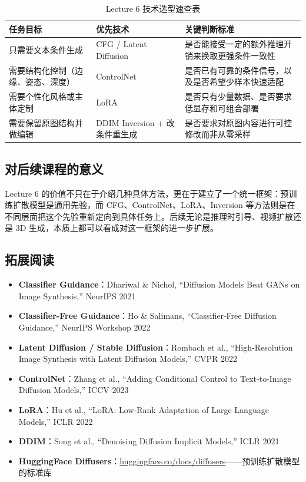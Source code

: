 \begin{table}[H]
\centering
\begin{tabular}{p{} p{} p{}}
\toprule
任务目标 & 优先技术 & 关键判断标准 \\
\midrule
只需要文本条件生成 & CFG / Latent Diffusion & 是否能接受一定的额外推理开销来换取更强条件一致性 \\
需要结构化控制（边缘、姿态、深度） & ControlNet & 是否已有可靠的条件信号，以及是否希望少样本快速适配 \\
需要个性化风格或主体定制 & LoRA & 是否只有少量数据、是否要求低显存和可组合部署 \\
需要保留原图结构并做编辑 & DDIM Inversion + 改条件重生成 & 是否要求对原图内容进行可控修改而非从零采样 \\
\bottomrule
\end{tabular}
\caption{Lecture 6 技术选型速查表}
\end{table}

\subsection{对后续课程的意义}

Lecture 6 的价值不只在于介绍几种具体方法，更在于建立了一个统一框架：预训练扩散模型是通用先验，而 CFG、ControlNet、LoRA、Inversion 等方法则是在不同层面把这个先验重新定向到具体任务上。后续无论是推理时引导、视频扩散还是 3D 生成，本质上都可以看成对这一框架的进一步扩展。

\subsection{拓展阅读}

\begin{itemize}
    \item \textbf{Classifier Guidance}：Dhariwal \& Nichol, ``Diffusion Models Beat GANs on Image Synthesis,'' NeurIPS 2021
    \item \textbf{Classifier-Free Guidance}：Ho \& Salimans, ``Classifier-Free Diffusion Guidance,'' NeurIPS Workshop 2022
    \item \textbf{Latent Diffusion / Stable Diffusion}：Rombach et al., ``High-Resolution Image Synthesis with Latent Diffusion Models,'' CVPR 2022
    \item \textbf{ControlNet}：Zhang et al., ``Adding Conditional Control to Text-to-Image Diffusion Models,'' ICCV 2023
    \item \textbf{LoRA}：Hu et al., ``LoRA: Low-Rank Adaptation of Large Language Models,'' ICLR 2022
    \item \textbf{DDIM}：Song et al., ``Denoising Diffusion Implicit Models,'' ICLR 2021
    \item \textbf{HuggingFace Diffusers}：\href{https://huggingface.co/docs/diffusers}{huggingface.co/docs/diffusers}——预训练扩散模型的标准库
\end{itemize}



